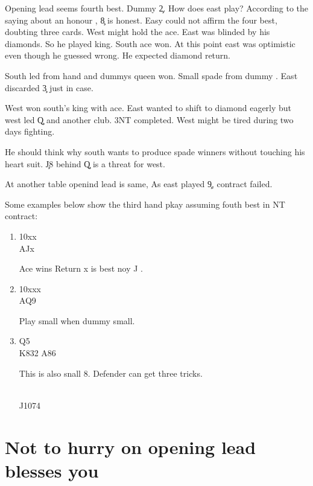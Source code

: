 Opening lead seems fourth best. Dummy \c 2. How does east
play? According to the saying about an honour , \c 8 is
honest. Easy could not affirm the four best, doubting three cards.
West might hold the ace. East was blinded by his diamonds.
So he played king. South ace won. At this point east was
optimistic even though he guessed wrong. He expected diamond return.

South led  from hand and dummys queen won. Small spade from 
dummy . East discarded \c 3 just in case.

West won south's king with ace. East wanted to shift to diamond eagerly 
but west led \c Q  and another club. 3NT completed.
West might be tired during two days fighting. 

He should think why south wants to produce spade winners without
touching his heart suit. \c J8 behind \c Q is a threat for west.

At another table openind lead is same, As east played \c 9,
contract failed.


Some examples below show the third hand pkay
assuming fouth best in NT contract:

\begin{enumerate}
\item {
\qquad 10xx\\
\qquad \qquad AJx \qquad 
\begin{minipage}[t]{\br}
Ace wins Return x is best noy J .
\end {minipage}
}
\item {
\qquad 10xxx\\
\qquad \qquad AQ9 \qquad 
\begin{minipage}[t]{\br}
Play small when dummy small.
\end {minipage}

}
\item {
\qquad Q5 \\
K832 \qquad A86 \qquad 
\begin{minipage}[t]{\br}
This is also snall 8.
Defender can get three tricks.
\end {minipage}\\
\qquad J1074 
}


\end{enumerate}

\section{Not to hurry on opening lead 
blesses you}


